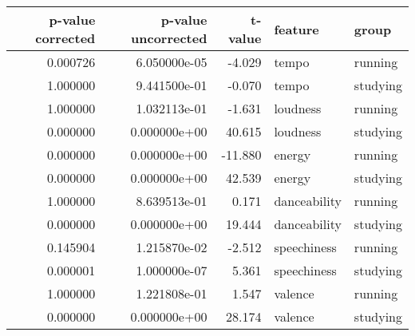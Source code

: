 \begin{tabular}{rrrll}
\toprule
 p-value corrected &  p-value uncorrected &  t-value &      feature &    group \\
\midrule
          0.000726 &         6.050000e-05 &   -4.029 &        tempo &  running \\
          1.000000 &         9.441500e-01 &   -0.070 &        tempo & studying \\
          1.000000 &         1.032113e-01 &   -1.631 &     loudness &  running \\
          0.000000 &         0.000000e+00 &   40.615 &     loudness & studying \\
          0.000000 &         0.000000e+00 &  -11.880 &       energy &  running \\
          0.000000 &         0.000000e+00 &   42.539 &       energy & studying \\
          1.000000 &         8.639513e-01 &    0.171 & danceability &  running \\
          0.000000 &         0.000000e+00 &   19.444 & danceability & studying \\
          0.145904 &         1.215870e-02 &   -2.512 &  speechiness &  running \\
          0.000001 &         1.000000e-07 &    5.361 &  speechiness & studying \\
          1.000000 &         1.221808e-01 &    1.547 &      valence &  running \\
          0.000000 &         0.000000e+00 &   28.174 &      valence & studying \\
\bottomrule
\end{tabular}
